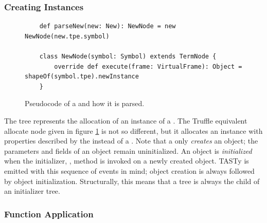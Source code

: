 \subsubsection*{Creating Instances}

\begin{figure}[!htb]
	\begin{verbatim}
	def parseNew(new: New): NewNode = new NewNode(new.tpe.symbol)	
	
	class NewNode(symbol: Symbol) extends TermNode {
		override def execute(frame: VirtualFrame): Object =  shapeOf(symbol.tpe).newInstance
	}
	\end{verbatim}
	\caption{Pseudocode of a  and how it is parsed.}
	\label{impl:new-node}
\end{figure}

The  tree represents the allocation of an instance of a .
The Truffle equivalent allocate node given in figure \ref{impl:new-node} is not so different, but it allocates an instance with properties described by the  instead of a .
Note that a  only \textit{creates} an object; the parameters and fields of an object remain uninitialized.
An object is \textit{initialized} when the initializer, , method is invoked on a newly created object.
TASTy is emitted with this sequence of events in mind; object creation is always followed by object initialization.
Structurally, this means that a  tree is always the child of an initializer  tree.

\subsubsection*{Function Application}
\label{impl:subsection:apply}

